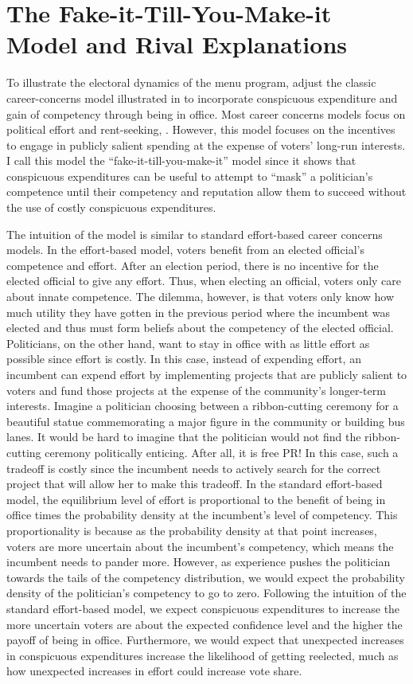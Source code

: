 \section*{The Fake-it-Till-You-Make-it Model and Rival Explanations}
To illustrate the electoral dynamics of the menu program, adjust the classic career-concerns model illustrated in \cite{gehlbach2021formal} to incorporate conspicuous expenditure and gain of competency through being in office. 
Most career concerns models focus on political effort and rent-seeking, \cite{barro_politiciancontrol} \cite{ferrejohn_acct}. 
However, this model focuses on the incentives to engage in publicly salient spending at the expense of voters' long-run interests. 
I call this model the ``fake-it-till-you-make-it'' model since it shows that conspicuous expenditures can be useful to attempt to ``mask'' a politician's competence until their competency and reputation allow them to succeed without the use of costly conspicuous expenditures.

The intuition of the model is similar to standard effort-based career concerns models. 
In the effort-based model, voters benefit from an elected official's competence and effort. 
After an election period, there is no incentive for the elected official to give any effort. 
Thus, when electing an official, voters only care about innate competence. The dilemma, however, is that voters only know how much utility they have gotten in the previous period where the incumbent was elected and thus must form beliefs about the competency of the elected official. 
Politicians, on the other hand, want to stay in office with as little effort as possible since effort is costly. 
In this case, instead of expending effort, an incumbent can expend effort by implementing projects that are publicly salient to voters and fund those projects at the expense of the community's longer-term interests. 
Imagine a politician choosing between a ribbon-cutting ceremony for a beautiful statue commemorating a major figure in the community or building bus lanes. 
It would be hard to imagine that the politician would not find the ribbon-cutting ceremony politically enticing. 
After all, it is free PR! In this case, such a tradeoff is costly since the incumbent needs to actively search for the correct project that will allow her to make this tradeoff. 
In the standard effort-based model, the equilibrium level of effort is proportional to the benefit of being in office times the probability density at the incumbent's level of competency. 
This proportionality is because as the probability density at that point increases, voters are more uncertain about the incumbent's competency, which means the incumbent needs to pander more. 
However, as experience pushes the politician towards the tails of the competency distribution, we would expect the probability density of the politician's competency to go to zero. 
Following the intuition of the standard effort-based model, we expect conspicuous expenditures to increase the more uncertain voters are about the expected confidence level and the higher the payoff of being in office. 
Furthermore, we would expect that unexpected increases in conspicuous expenditures increase the likelihood of getting reelected, much as how unexpected increases in effort could increase vote share. 

